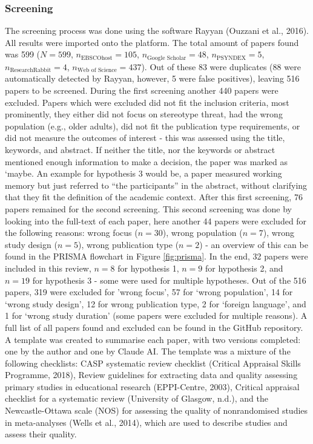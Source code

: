 \documentclass[
  stu]{apa7}
\begin{document}
\subsubsection{Screening}\label{screening}

The screening process was done using the software Rayyan (Ouzzani et al., 2016). All results were imported onto the platform.
The total amount of papers found was 599 (\(N=599\), \(n_{\text{EBSCOhost}} = 105\), \(n_{\text{Google Scholar}} = 48\), \(n_{\text{PSYNDEX}} = 5\), \(n_{\text{ResearchRabbit}} = 4\), \(n_{\text{Web of Science}} = 437\)). Out of these 83 were duplicates (88 were automatically detected by Rayyan, however, 5 were false positives), leaving 516 papers to be screened. During the first screening another 440 papers were excluded.
Papers which were excluded did not fit the inclusion criteria, most prominently, they either did not focus on stereotype threat, had the wrong population (e.g., older adults), did not fit the publication type requirements, or did not measure the outcomes of interest - this was assessed using the title, keywords, and abstract. If neither the title, nor the keywords or abstract mentioned enough information to make a decision, the paper was marked as `maybe.
An example for hypothesis 3 would be, a paper measured working memory but just referred to ``the participants'' in the abstract, without clarifying that they fit the definition of the academic context. After this first screening, 76 papers remained for the second screening.
This second screening was done by looking into the full-text of each paper, here another 44 papers were excluded for the following reasons: wrong focus (\(n = 30\)), wrong population (\(n = 7\)), wrong study design (\(n = 5\)), wrong publication type (\(n = 2\)) - an overview of this can be found in the PRISMA flowchart in Figure \ref{fig:prisma}.
In the end, 32 papers were included in this review, \(n = 8\) for hypothesis 1, \(n = 9\) for hypothesis 2, and \(n = 19\) for hypothesis 3 - some were used for multiple hypotheses. Out of the 516 papers, 319 were excluded for 'wrong focus', 57 for `wrong population', 14 for `wrong study design', 12 for wrong publication type, 2 for `foreign language', and 1 for `wrong study duration' (some papers were excluded for multiple reasons). A full list of all papers found and excluded can be found in the GitHub repository.\\
A template was created to summarise each paper, with two versions completed: one by the author and one by Claude AI.
The template was a mixture of the following checklists: CASP systematic review checklist (Critical Appraisal Skills Programme, 2018), Review guidelines for extracting data and quality assessing primary studies in educational research (EPPI-Centre, 2003), Critical appraisal checklist for a systematic review (University of Glasgow, n.d.), and the Newcastle-Ottawa scale (NOS) for assessing the quality of nonrandomised studies in meta-analyses (Wells et al., 2014), which are used to describe studies and assess their quality.
\end{document}
